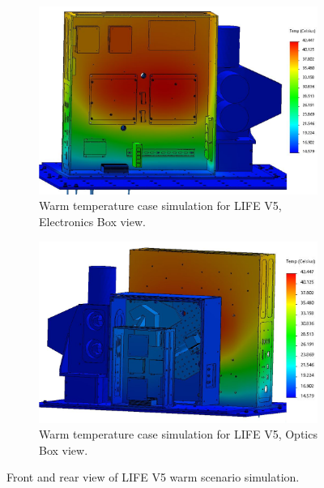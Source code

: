 \begin{figure}
    \centering
    \begin{subfigure}[h]{0.9\textwidth}
        \centering
        \includegraphics[width=\textwidth]{chap3_images/LIFE_V5_initial_images/Iteration_3_ebox_no_labels_FIXED.png}
        \caption{Warm temperature case simulation for LIFE V5, Electronics Box view.}
        \label{fig:LIFE_V5_TA_WARM_EBOX}
    \end{subfigure}
    \begin{subfigure}[h]{0.9\textwidth}
        \centering
        \includegraphics[width=\textwidth]{chap3_images/LIFE_V5_initial_images/Iteration_3_no_labels_FIXED.png}
        \caption{Warm temperature case simulation for LIFE V5, Optics Box view.}
        \label{fig:LIFE_V4_TA_WARM_OBOX}
    \end{subfigure}
    \caption{Front and rear view of LIFE V5 warm scenario simulation.}
    \label{LIFE_V5_Prelim_TA_WARM}
\end{figure}

